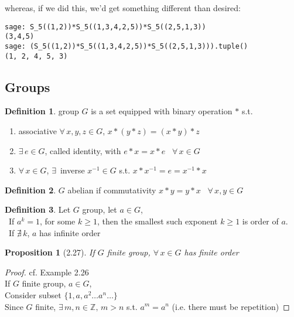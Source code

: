 \documentclass[twoside,landscape]{amsart}
\theoremstyle{plain}
\newtheorem{proposition}{Proposition}
\theoremstyle{definition}
\newtheorem{definition}{Definition}
\theoremstyle{remark}
\begin{document}
\begin{multicols*}{2}
whereas, if we did this, we'd get something different than desired:
\begin{lstlisting}
sage: S_5((1,2))*S_5((1,3,4,2,5))*S_5((2,5,1,3))
(3,4,5)
sage: (S_5((1,2))*S_5((1,3,4,2,5))*S_5((2,5,1,3))).tuple()
(1, 2, 4, 5, 3)
\end{lstlisting}

\subsection{Groups }


\begin{definition}
  group $G$ is a set equipped with binary operation $*$ s.t.
\begin{enumerate}
\item associative $\forall \, x,y,z \in G$, $x*(y*z) = (x*y)*z$
\item $\exists \, e \in G$, called identity, with $e* x = x*e$ \, $\forall \, x \in G$  
\item $\forall \, x \in G$, $\exists \, $ inverse $x^{-1} \in G$ s.t. $x*x^{-1} = e = x^{-1} * x$ 
\end{enumerate}
\end{definition}

\begin{definition}
  $G$ abelian if commutativity $x*y = y*x$ \, $\forall \, x,y \in G$
\end{definition}

\begin{definition} Let $G$ group, let $a \in G$, \\
  \quad \, If $a^k =1$, for some $k\geq 1$, then the smallest such exponent $k\geq 1$ is order of $a$.  \\
\quad \, If $\nexists \, k$, $a$ has infinite order
\end{definition}

\begin{proposition}[2.27] If $G$ finite group, $\forall \, x \in G$ has finite order  \end{proposition}

\begin{proof}
cf. Example 2.26 \\

If $G$ finite group, $a\in G$, \\
\quad Consider subset $\lbrace 1, a, a^2 \dots a^n \dots \rbrace$ \\
\quad \quad Since $G$ finite, $\exists \, m,n \in \mathbb{Z}, \, m > n$ s.t. $a^m = a^n$ (i.e. there must be repetition) 


\end{proof}
\end{multicols*}
\end{document}
